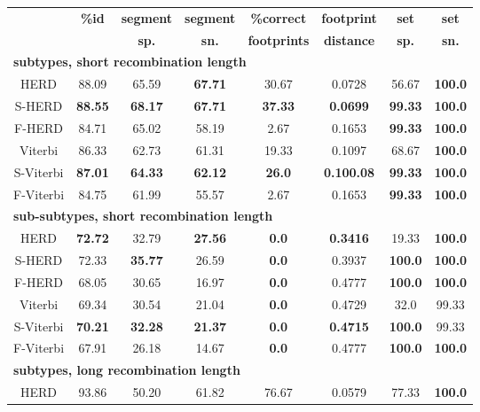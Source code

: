 \begin{table}
\begin{center}
\begin{tabular}{cccccccc}
&{\bf \%id}&\bf segment&\bf segment&\bf \%correct&\bf footprint&\bf set&\bf  set\\ 
&&\bf sp.& \bf sn.& \bf footprints&\bf distance&\bf    sp.&\bf  sn.\\ 
\hline
\hline
\multicolumn{8}{l}{\bf subtypes, short recombination length}\\\hline
HERD     &88.09     & 65.59     &\bf 67.71  & 30.67     &     0.0728    & 56.67      &\bf 100.0  \\
S-HERD   &\bf 88.55 & \bf 68.17 &\bf 67.71  & \bf 37.33 & \bf 0.0699    & \bf 99.33  &\bf 100.0  \\
F-HERD   &84.71     & 65.02     & 58.19     & 2.67      &     0.1653    & \bf 99.33  &\bf 100.0  \\\hline
Viterbi  &     86.33&     62.73 &    61.31  &     19.33 &     0.1097    &     68.67 &\bf 100.0  \\
S-Viterbi& \bf 87.01&\bf  64.33 &\bf 62.12  &  \bf 26.0 & \bf 0.100.08    & \bf 99.33 &\bf 100.0  \\
F-Viterbi&     84.75&     61.99 &    55.57  &      2.67 &     0.1653    & \bf 99.33 &\bf 100.0  \\\hline\hline
\multicolumn{8}{l}{\bf sub-subtypes, short recombination length}\\\hline
HERD     &\bf 72.72 & 32.79     & \bf 27.56 & \bf 0.0   & \bf 0.3416    & 19.33     &\bf 100.0  \\
S-HERD   &72.33     &\bf 35.77  & 26.59     & \bf 0.0   &     0.3937    & \bf 100.0   &\bf 100.0  \\
F-HERD   &68.05     &30.65      & 16.97     & \bf 0.0   &     0.4777    & \bf 100.0   &\bf 100.0  \\\hline
Viterbi  &     69.34&     30.54 &     21.04 & \bf   0.0 &     0.4729    &      32.0 & 99.33   \\
S-Viterbi&\bf  70.21& \bf 32.28 & \bf 21.37 & \bf  0.0  & \bf 0.4715    & \bf 100.0   & 99.33   \\
F-Viterbi&     67.91&     26.18 &     14.67 & \bf  0.0  &     0.4777    & \bf 100.0   & \bf 100.0 \\\hline\hline
\multicolumn{8}{l}{\bf subtypes, long recombination length}\\\hline
HERD     &93.86     & 50.20     & 61.82     & 76.67     &     0.0579    & 77.33     &\bf 100.0  \\

\end{tabular}
\end{center}
\end{table}
